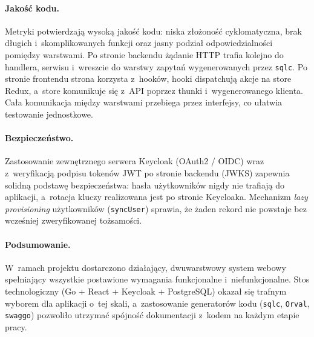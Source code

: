 \documentclass[12pt, a4paper, oneside]{article}
\begin{document}
\paragraph{Jakość kodu.}
Metryki potwierdzają wysoką jakość kodu: niska złożoność cyklomatyczna,
brak długich i~skomplikowanych funkcji oraz jasny podział odpowiedzialności
pomiędzy warstwami. Po stronie backendu żądanie HTTP trafia kolejno
do handlera, serwisu i~wreszcie do warstwy zapytań wygenerowanych przez
\texttt{sqlc}. Po stronie frontendu strona korzysta z~hooków, hooki
dispatchują akcje na store Redux, a~store komunikuje się z~API poprzez
thunki i~wygenerowanego klienta. Cała komunikacja między warstwami
przebiega przez interfejsy, co ułatwia testowanie jednostkowe.

\paragraph{Bezpieczeństwo.}
Zastosowanie zewnętrznego serwera Keycloak (OAuth2 / OIDC) wraz
z~weryfikacją podpisu tokenów JWT po stronie backendu (JWKS) zapewnia
solidną podstawę bezpieczeństwa: hasła użytkowników nigdy nie trafiają
do aplikacji, a~rotacja kluczy realizowana jest po stronie Keycloaka.
Mechanizm \emph{lazy provisioning} użytkowników (\texttt{syncUser})
sprawia, że żaden rekord nie powstaje bez wcześniej zweryfikowanej tożsamości.

\paragraph{Podsumowanie.}
W~ramach projektu dostarczono działający, dwuwarstwowy system webowy
spełniający wszystkie postawione wymagania funkcjonalne i~niefunkcjonalne.
Stos technologiczny (Go + React + Keycloak + PostgreSQL) okazał się
trafnym wyborem dla aplikacji o~tej skali, a~zastosowanie generatorów
kodu (\texttt{sqlc}, \texttt{Orval}, \texttt{swaggo}) pozwoliło utrzymać
spójność dokumentacji z~kodem na każdym etapie pracy.
\end{document}
